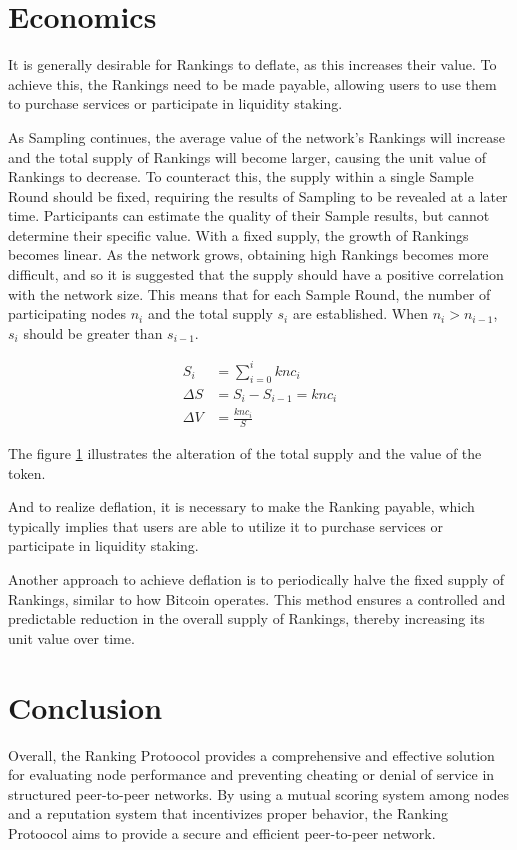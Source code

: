 \documentclass[twocolumn]{article}
\begin{document}
\section{Economics}

It is generally desirable for Rankings to deflate, as this increases their value. To achieve this, the Rankings need to be made payable, allowing users to use them to purchase services or participate in liquidity staking.

As Sampling continues, the average value of the network's Rankings will increase and the total supply of Rankings will become larger, causing the unit value of Rankings to decrease. To counteract this, the supply within a single Sample Round should be fixed, requiring the results of Sampling to be revealed at a later time. Participants can estimate the quality of their Sample results, but cannot determine their specific value. With a fixed supply, the growth of Rankings becomes linear. As the network grows, obtaining high Rankings becomes more difficult, and so it is suggested that the supply should have a positive correlation with the network size. This means that for each Sample Round, the number of participating nodes $n_i$ and the total supply $s_i$ are established. When $n_i > n_{i-1}$, $s_i$ should be greater than $s_{i-1}$.

\begin{figure}[htbp]
  \label{supply}
\begin{align}
  S_i &= \sum_{i=0}^{i}knc_i\\
  \Delta S &= S_i - S_{i-1} = knc_i\\
  \Delta V &= \frac{knc_i}{S}
 \end{align}
\end{figure}

The figure \ref{supply} illustrates the alteration of the total supply and the value of the token.

And to realize deflation, it is necessary to make the Ranking payable, which typically implies that users are able to utilize it to purchase services or participate in liquidity staking.

Another approach to achieve deflation is to periodically halve the fixed supply of Rankings, similar to how Bitcoin operates. This method ensures a controlled and predictable reduction in the overall supply of Rankings, thereby increasing its unit value over time.


\section{Conclusion}
Overall, the Ranking Protoocol provides a comprehensive and effective solution for evaluating node performance and preventing cheating or denial of service in structured peer-to-peer networks. By using a mutual scoring system among nodes and a reputation system that incentivizes proper behavior, the Ranking Protoocol aims to provide a secure and efficient peer-to-peer network.


\end{document}
